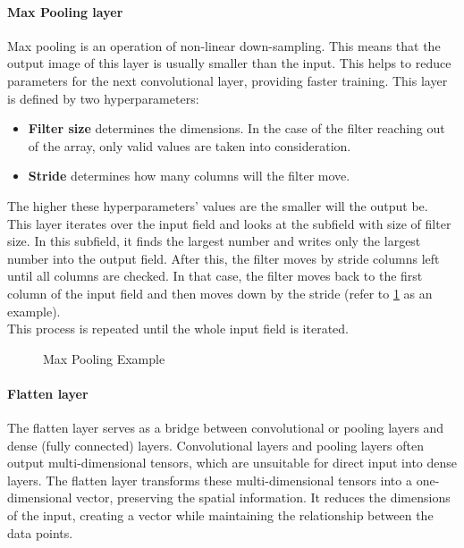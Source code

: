 \paragraph{Max Pooling layer}
Max pooling is an operation of non-linear down-sampling. This means that the output image of this layer is usually smaller than the input. This helps to reduce parameters for the next convolutional layer, providing faster training.  This layer is defined by two hyperparameters:

\begin{itemize}
	\item \textbf{Filter size} determines the dimensions. In the case of the filter reaching out of the array, only valid values are taken into consideration.
	\item \textbf{Stride} determines how many columns will the filter move.
\end{itemize}

The higher these hyperparameters' values are the smaller will the output be.\\
This layer iterates over the input field and looks at the subfield with size of filter size. In this subfield, it finds the largest number and writes only the largest number into the output field. After this, the filter moves by stride columns left until all columns are checked. In that case, the filter moves back to the first column of the input field and then moves down by the stride (refer to \ref{maxPooling} as an example).\\ This process is repeated until the whole input field is iterated.

\begin{figure}
	\caption[Max Pooling Example]{Max Pooling Example \cite{pooling}}
	\label{maxPooling}
\end{figure}

\paragraph{Flatten layer}
The flatten layer serves as a bridge between convolutional or pooling layers and dense (fully connected) layers. Convolutional layers and pooling layers often output multi-dimensional tensors, which are unsuitable for direct input into dense layers. The flatten layer transforms these multi-dimensional tensors into a one-dimensional vector, preserving the spatial information. It reduces the dimensions of the input, creating a vector while maintaining the relationship between the data points.
